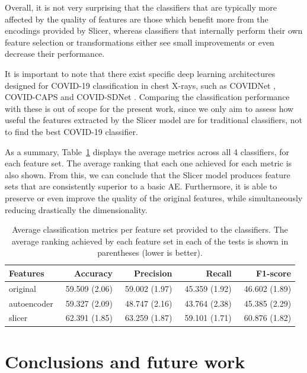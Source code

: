 \documentclass[
	fontsize=11pt, %
	twoside=false, %
	open=any, %
	secnumdepth=1, %
]{kaobook}
\begin{document}
Overall, it is not very surprising that the classifiers that are typically more affected by the quality of features are those which benefit more from the encodings provided by Slicer, whereas classifiers that internally perform their own feature selection or transformations either see small improvements or even decrease their performance.

It is important to note that there exist specific deep learning architectures designed for COVID-19 classification in chest X-rays, such as COVIDNet \cite{wang2020covid}, COVID-CAPS \cite{afshar2020covid} and COVID-SDNet \cite{9254002}. Comparing the classification performance with these is out of scope for the present work, since we only aim to assess how useful the features extracted by the Slicer model are for traditional classifiers, not to find the best COVID-19 classifier.

As a summary, Table~\ref{tab:overall} displays the average metrics across all 4 classifiers, for each feature set. The average ranking that each one achieved for each metric is also shown. From this, we can conclude that the Slicer model produces feature sets that are consistently superior to a basic AE. Furthermore, it is able to preserve or even improve the quality of the original features, while simultaneously reducing drastically the dimensionality.  

\begin{table}[htbp]
    \centering
    \begin{tabular}{lrrrr}
\toprule
Features & Accuracy & Precision & Recall & F1-score\\
\midrule
original & 59.509 (2.06) & 59.002 (1.97) & 45.359 (1.92) & 46.602 (1.89)\\
autoencoder & ~59.327 (2.09) & ~48.747 (2.16) & ~43.764 (2.38) & ~45.385 (2.29)\\
slicer & 62.391 (1.85) & 63.259 (1.87) & 59.101 (1.71) & 60.876 (1.82)\\
\bottomrule
\end{tabular}
    \caption{Average classification metrics per feature set provided to the classifiers. The average ranking achieved by each feature set in each of the tests is shown in parentheses (lower is better).}
    \label{tab:overall}
\end{table}


\section{Conclusions and future work}\label{sec.conc}
\end{document}

